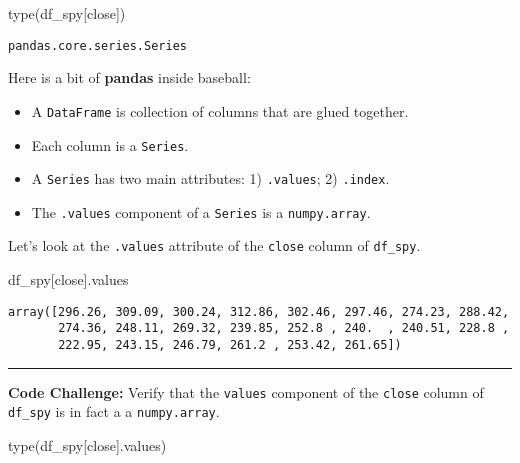 \documentclass[
  letterpaper,
  DIV=11,
  numbers=noendperiod]{scrreprt}
\newenvironment{Shaded}{\begin{snugshade}}{\end{snugshade}}
\newcommand{\BuiltInTok}[1]{\textcolor[rgb]{0.00,0.23,0.31}{#1}}
\newcommand{\NormalTok}[1]{\textcolor[rgb]{0.00,0.23,0.31}{#1}}
\newcommand{\StringTok}[1]{\textcolor[rgb]{0.13,0.47,0.30}{#1}}
\begin{document}
\begin{Shaded}
\begin{Highlighting}[]
\BuiltInTok{type}\NormalTok{(df\_spy[}\StringTok{\textquotesingle{}close\textquotesingle{}}\NormalTok{])}
\end{Highlighting}
\end{Shaded}

\begin{verbatim}
pandas.core.series.Series
\end{verbatim}

Here is a bit of \textbf{pandas} inside baseball:

\begin{itemize}
\item
  A \texttt{DataFrame} is collection of columns that are glued together.
\item
  Each column is a \texttt{Series}.
\item
  A \texttt{Series} has two main attributes: 1) \texttt{.values}; 2)
  \texttt{.index}.
\item
  The \texttt{.values} component of a \texttt{Series} is a
  \texttt{numpy.array}.
\end{itemize}

Let's look at the \texttt{.values} attribute of the \texttt{close}
column of \texttt{df\_spy}.

\begin{Shaded}
\begin{Highlighting}[]
\NormalTok{df\_spy[}\StringTok{\textquotesingle{}close\textquotesingle{}}\NormalTok{].values}
\end{Highlighting}
\end{Shaded}

\begin{verbatim}
array([296.26, 309.09, 300.24, 312.86, 302.46, 297.46, 274.23, 288.42,
       274.36, 248.11, 269.32, 239.85, 252.8 , 240.  , 240.51, 228.8 ,
       222.95, 243.15, 246.79, 261.2 , 253.42, 261.65])
\end{verbatim}

\begin{center}\rule{0.5\linewidth}{0.5pt}\end{center}

\textbf{Code Challenge:} Verify that the \texttt{values} component of
the \texttt{close} column of \texttt{df\_spy} is in fact a a
\texttt{numpy.array}.

\begin{Shaded}
\begin{Highlighting}[]
\BuiltInTok{type}\NormalTok{(df\_spy[}\StringTok{\textquotesingle{}close\textquotesingle{}}\NormalTok{].values)}
\end{Highlighting}
\end{Shaded}
\end{document}

